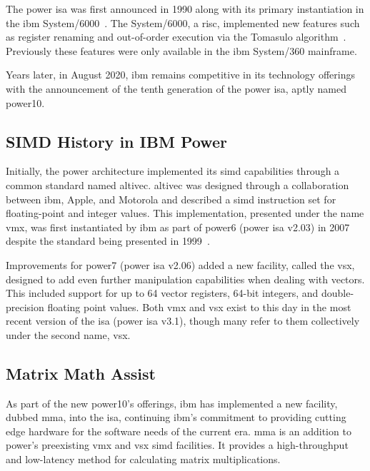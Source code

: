 \documentclass[\main/thesis.tex]{subfiles}
\begin{document}
The \gls{power} \gls{isa} was first announced in 1990 along with its primary instantiation in the \gls{ibm} System/6000~\autocite{montoye1990design}.
The System/6000, a \gls{risc}, implemented new features such as register renaming and out-of-order execution via the Tomasulo algorithm~\autocite{tomasulo1967efficient}.
Previously these features were only available in the \gls{ibm} System/360 mainframe.

Years later, in August 2020, \gls{ibm} remains competitive in its technology offerings with the announcement of the tenth generation of the \gls{power} \gls{isa}, aptly named \gls{power10}.

\subsection{SIMD History in IBM Power}
Initially, the \gls{power} architecture implemented its \gls{simd} capabilities through a common standard named \gls{altivec}.
\Gls{altivec} was designed through a collaboration between \gls{ibm}, Apple, and Motorola and described a \gls{simd} instruction set for floating-point and integer values.
This implementation, presented under the name \gls{vmx}, was first instantiated by \gls{ibm} as part of \gls{power}6 (\gls{power} \gls{isa} v2.03) in 2007~\autocite{eisen2007ibm} despite the standard being presented in 1999~\autocite{tyler1999altivec}.

Improvements for \gls{power}7 (\gls{power} \gls{isa} v2.06) added a new facility, called the \gls{vsx}, designed to add even further manipulation capabilities when dealing with vectors.
This included support for up to 64 vector registers, 64-bit integers, and double-precision floating point values.
Both \gls{vmx} and \gls{vsx} exist to this day in the most recent version of the \gls{isa} (\gls{power} \gls{isa} v3.1), though many refer to them collectively under the second name, \gls{vsx}.

\subsection{Matrix Math Assist}
\label{sec:mmaintro}
As part of the new \gls{power10}'s offerings, \gls{ibm} has implemented a new facility, dubbed \gls{mma}, into the \gls{isa}, continuing \gls{ibm}'s commitment to providing cutting edge hardware for the software needs of the current era.
\gls{mma} is an addition to \gls{power}'s preexisting \gls{vmx} and \gls{vsx} \gls{simd} facilities.
It provides a high-throughput and low-latency method for calculating matrix multiplications.
\end{document}
